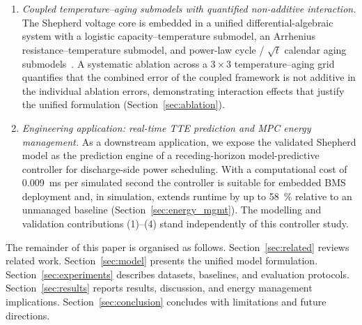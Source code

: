 \documentclass[5p,times,number]{elsarticle}
\newcommand{\secref}[1]{\hyperref[#1]{\textup{Section~\ref*{#1}}}}
\def\secref#1{Section~\ref{#1}}
\begin{document}
\begin{enumerate}[leftmargin=*, label=\arabic*.]
    \item \textit{Coupled temperature--aging submodels with quantified non-additive interaction.}
    The Shepherd voltage core is embedded in a unified differential-algebraic system with a logistic capacity--temperature submodel, an Arrhenius resistance--temperature submodel, and power-law cycle / $\sqrt{t}$ calendar aging submodels~\cite{Vetter2005,Wang2011JPS,Schmalstieg2014JPS}.
    A systematic ablation across a $3\times3$ temperature--aging grid quantifies that the combined error of the coupled framework is not additive in the individual ablation errors, demonstrating interaction effects that justify the unified formulation (\secref{sec:ablation}).
    \item \textit{Engineering application: real-time TTE prediction and MPC energy management.}
    As a downstream application, we expose the validated Shepherd model as the prediction engine of a receding-horizon model-predictive controller for discharge-side power scheduling.
    With a computational cost of \SI{0.009}{\milli\second} per simulated second the controller is suitable for embedded BMS deployment and, in simulation, extends runtime by up to \SI{58}{\percent} relative to an unmanaged baseline (\secref{sec:energy_mgmt}).
    The modelling and validation contributions (1)--(4) stand independently of this controller study.
\end{enumerate}

The remainder of this paper is organised as follows.
\secref{sec:related} reviews related work.
\secref{sec:model} presents the unified model formulation.
\secref{sec:experiments} describes datasets, baselines, and evaluation protocols.
\secref{sec:results} reports results, discussion, and energy management implications.
\secref{sec:conclusion} concludes with limitations and future directions.

\end{document}
